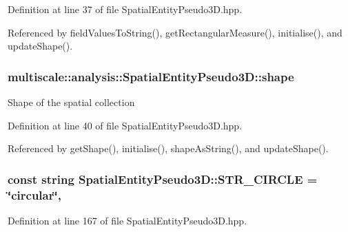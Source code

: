 Definition at line 37 of file Spatial\-Entity\-Pseudo3\-D.\-hpp.



Referenced by field\-Values\-To\-String(), get\-Rectangular\-Measure(), initialise(), and update\-Shape().

\hypertarget{classmultiscale_1_1analysis_1_1SpatialEntityPseudo3D_abad3acd3d7067e8e86e168e692cb2c2e}{
\subsubsection[{shape}]{ multiscale\-::analysis\-::\-Spatial\-Entity\-Pseudo3\-D\-::shape\hspace{0.3cm}{\ttfamily [protected]}}}\label{classmultiscale_1_1analysis_1_1SpatialEntityPseudo3D_abad3acd3d7067e8e86e168e692cb2c2e}
Shape of the spatial collection 

Definition at line 40 of file Spatial\-Entity\-Pseudo3\-D.\-hpp.



Referenced by get\-Shape(), initialise(), shape\-As\-String(), and update\-Shape().

\hypertarget{classmultiscale_1_1analysis_1_1SpatialEntityPseudo3D_a561e862c97a4717eb5b4977c55d05d90}{
\subsubsection[{S\-T\-R\-\_\-\-C\-I\-R\-C\-L\-E}]{\setlength{\rightskip}{0pt plus 5cm}const string Spatial\-Entity\-Pseudo3\-D\-::\-S\-T\-R\-\_\-\-C\-I\-R\-C\-L\-E = \char`\"{}circular\char`\"{}\hspace{0.3cm}{\ttfamily [static]}, {\ttfamily [protected]}}}\label{classmultiscale_1_1analysis_1_1SpatialEntityPseudo3D_a561e862c97a4717eb5b4977c55d05d90}


Definition at line 167 of file Spatial\-Entity\-Pseudo3\-D.\-hpp.



